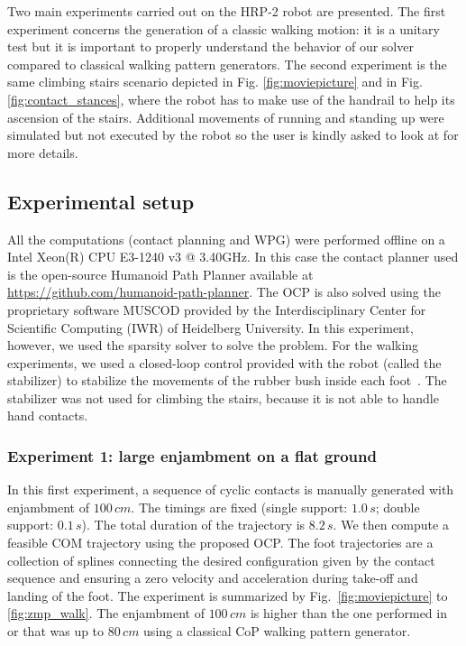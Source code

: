 Two main experiments carried out on the HRP-2 robot are presented. The first experiment concerns the generation of a classic walking motion: it is a unitary test but it is important to properly understand the behavior of our solver compared to classical walking pattern generators. The second experiment is the same climbing stairs scenario depicted in Fig. \ref{fig:moviepicture} and in Fig. \ref{fig:contact_stances}, where the robot has to make use of the handrail to help its ascension of the stairs. 
Additional movements of running and standing up were simulated but not executed by the robot so the user is kindly asked to look at \cite{carpentier:hal-01203507} for more details.

\subsection*{Experimental setup}

All the computations (contact planning and WPG) were performed offline on a Intel Xeon(R) CPU E3-1240 v3 @ 3.40GHz.
In this case the contact planner used is the open-source Humanoid Path Planner available at \url{https://github.com/humanoid-path-planner}.
The OCP is also solved using the proprietary software MUSCOD provided by the Interdisciplinary Center for Scientific Computing (IWR) of Heidelberg University.
In this experiment, however, we used the sparsity solver to solve the problem.
For the walking experiments, we used a closed-loop control provided with the robot (called the stabilizer) to stabilize the movements of the rubber bush inside each foot~\cite{6942670}.
The stabilizer was not used for climbing the stairs, because it is not able to handle hand contacts.

\subsubsection*{Experiment 1: large enjambment on a flat ground}

In this first experiment, a sequence of cyclic contacts is manually generated with enjambment of $100\,cm$.
The timings are fixed (single support: $1.0\,s$; double support: $0.1\,s$). The total duration of the trajectory is $8.2\,s$.
We then compute a feasible COM trajectory using the proposed OCP.
The foot trajectories are a collection of splines connecting the desired configuration given by the contact sequence and ensuring a zero velocity and acceleration during take-off and landing of the foot.
The experiment is summarized by Fig.~\ref{fig:moviepicture} to \ref{fig:zmp_walk}.
The enjambment of $100\,cm$ is higher than the one performed in \cite{garcia:icra:14} or \cite{naveau:ral:2016} that was up to $80\,cm$ using a classical CoP walking pattern generator. 


